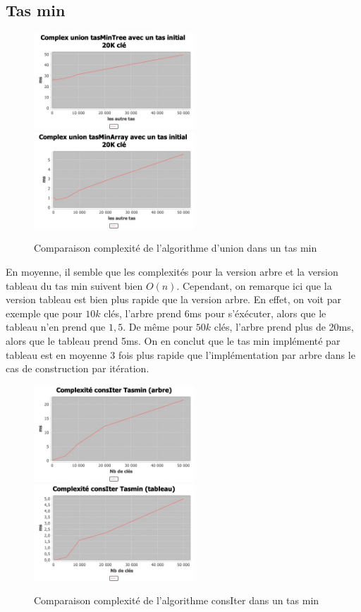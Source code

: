 \documentclass{article}
\begin{document}
\subsection{Tas min}
\begin{figure}[h!]
\centering
\includegraphics[width=6cm]{tas_tree_union.jpg}\hfill
\includegraphics[width=6cm]{tas_array_union.jpg}
\caption{Comparaison complexité de l'algorithme d'union dans un tas min}
\label{fig:tasunion}
\end{figure}


En moyenne, il semble que les complexités pour la version arbre et la version tableau du tas min suivent bien $O(n)$. Cependant, on remarque ici que la version tableau est bien plus rapide que la version arbre. En effet, on voit par exemple que pour $10k$ clés, l’arbre prend 6ms pour s’éxécuter, alors que le tableau n’en prend que $1,5$. De même pour $50k$ clés, l’arbre prend plus de 20ms, alors que le tableau prend 5ms. On en conclut que le tas min implémenté par tableau est en moyenne $3$ fois plus rapide que l’implémentation par arbre dans le cas de construction par itération. 


\begin{figure}[h!]
\centering
\includegraphics[width=6cm]{tas_tree_consiter.jpg}\hfill
\includegraphics[width=6cm]{tas_array_consiter.jpg}
\caption{Comparaison complexité de l'algorithme consIter dans un tas min}
\label{fig:tasconsiter}
\end{figure}
\end{document}
